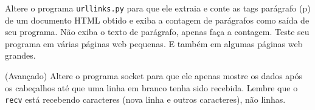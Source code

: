 \begin{ex}
Altere o programa {\tt urllinks.py} para que ele extraia e conte as tags
parágrafo (p) de um documento HTML obtido e exiba a contagem de parágrafos
como saída de seu programa. Não exiba o texto de parágrafo, apenas faça a
contagem. Teste seu programa em várias páginas web pequenas. E também em
algumas páginas web grandes.
\end{ex}

\begin{ex}
(Avançado) Altere o programa socket para que ele apenas mostre os dados
após os cabeçalhos até que uma linha em branco tenha sido recebida. Lembre 
que o {\tt recv} está recebendo caracteres (nova linha e outros caracteres),
não linhas.
\end{ex}
